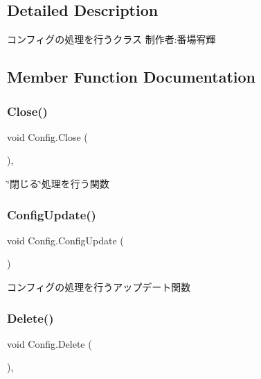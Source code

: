 \subsection{Detailed Description}
コンフィグの処理を行うクラス 制作者\+:番場宥輝 



\subsection{Member Function Documentation}
\mbox{\label{class_config_a7a5cdf495c53a17595d439527813abb3}} 
\subsubsection{\texorpdfstring{Close()}{Close()}}
{\footnotesize\ttfamily void Config.\+Close (\begin{DoxyParamCaption}{ }\end{DoxyParamCaption})\hspace{0.3cm}{\ttfamily [inline]}, {\ttfamily [private]}}



\char`\"{}閉じる\char`\"{}処理を行う関数 

\mbox{\label{class_config_a025cd5d374f44cbd1265d63f69a7c239}} 
\subsubsection{\texorpdfstring{Config\+Update()}{ConfigUpdate()}}
{\footnotesize\ttfamily void Config.\+Config\+Update (\begin{DoxyParamCaption}{ }\end{DoxyParamCaption})\hspace{0.3cm}{\ttfamily [inline]}}



コンフィグの処理を行うアップデート関数 

\mbox{\label{class_config_ad0b23b838070e0fc7d6232ccc3086f44}} 
\subsubsection{\texorpdfstring{Delete()}{Delete()}}
{\footnotesize\ttfamily void Config.\+Delete (\begin{DoxyParamCaption}{ }\end{DoxyParamCaption})\hspace{0.3cm}{\ttfamily [inline]}, {\ttfamily [private]}}



